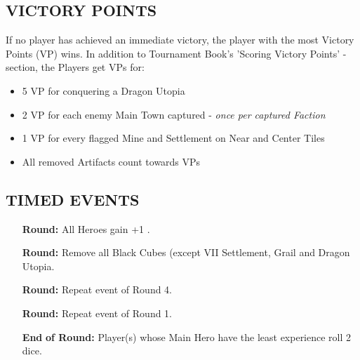 \begin{multicols*}{2}
\subsection*{\MakeUppercase{Victory Points}}
If no player has achieved an immediate victory, the player with the most Victory Points (VP) wins. In addition to Tournament Book's 'Scoring Victory Points' -section, the Players get VPs for:

\begin{itemize}
 \item 5 VP for conquering a Dragon Utopia
 \item 2 VP for each enemy Main Town captured - \textit{once per captured Faction}
 \item 1 VP for every flagged Mine and Settlement on Near and Center Tiles
 \item All removed Artifacts count towards VPs
\end{itemize}

\subsection*{\MakeUppercase{Timed Events}}

\begin{itemize}
  \item[\textbf{\nth{1}}] \textbf{Round:} All Heroes gain +1 .
  \item[\textbf{\nth{4}}] \textbf{Round:} Remove all Black Cubes (except VII Settlement, Grail and Dragon Utopia.
  \item[\textbf{\nth{8}}] \textbf{Round:} Repeat event of Round 4.
  \item[\textbf{\nth{9}}] \textbf{Round:} Repeat event of Round 1.
  \item[\textbf{End}] \textbf{of  Round:} Player(s) whose Main Hero have the least experience roll 2  dice.
\end{itemize}


\end{multicols*}
